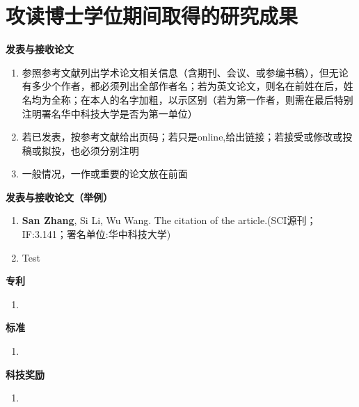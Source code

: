 \chapter{攻读博士学位期间取得的研究成果}

\renewcommand{\labelenumi}{[\arabic{enumi}]} %

\textbf{发表与接收论文}
\begin{enumerate}
    \item 参照参考文献列出学术论文相关信息（含期刊、会议、或参编书稿），但无论有多少个作者，都必须列出全部作者名；若为英文论文，则名在前姓在后，姓名均为全称；在本人的名字加粗，以示区别（若为第一作者，则需在最后特别注明署名华中科技大学是否为第一单位）
    \item 若已发表，按参考文献给出页码；若只是online,给出链接；若接受或修改或投稿或拟投，也必须分别注明
    \item 一般情况，一作或重要的论文放在前面
\end{enumerate}

\textbf{发表与接收论文（举例）}
\begin{enumerate}
    \item \textbf{San Zhang}, Si Li, Wu Wang. The citation of the article.(SCI源刊；IF:3.141；署名单位:华中科技大学)
    \item Test
\end{enumerate}

\textbf{专\qquad 利}
\begin{enumerate}
    \item 
\end{enumerate}

\textbf{标\qquad 准}
\begin{enumerate}
    \item 
\end{enumerate}

\textbf{科技奖励}
\begin{enumerate}
    \item 
\end{enumerate}



\renewcommand{\labelenumi}{\arabic{enumi}} %